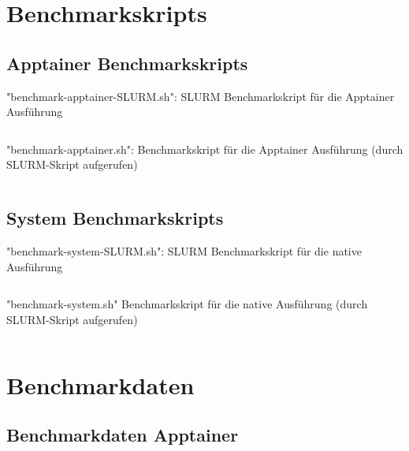\chapter{Benchmarkskripts} \label{cha:appendix-benchmarkskripts}

\section{Apptainer Benchmarkskripts}

\begin{listing}[H]
    \caption{"benchmark-apptainer-SLURM.sh": SLURM Benchmarkskript für die Apptainer Ausführung}
    \label{lst:appdx-SLURM-benchmark-apptainer}
    \inputminted{bash}{./code-examples/benchmark-apptainer-SLURM.sh}
\end{listing}

\begin{listing}[H]
    \caption{"benchmark-apptainer.sh": Benchmarkskript für die Apptainer Ausführung (durch SLURM-Skript aufgerufen)}
    \label{lst:appdx-benchmark-apptainer}
    \inputminted{bash}{./code-examples/benchmark-apptainer.sh}
\end{listing}

\section{System Benchmarkskripts}

\begin{listing}[H]
    \caption{"benchmark-system-SLURM.sh": SLURM Benchmarkskript für die native Ausführung}
    \label{lst:appdx-SLURM-benchmark-system}
    \inputminted{bash}{./code-examples/benchmark-system-SLURM.sh}
\end{listing}
\pagebreak

\begin{listing}[H]
    \caption{"benchmark-system.sh" Benchmarkskript für die native Ausführung (durch SLURM-Skript aufgerufen)}
    \label{lst:appdx-benchmark-system}
    \inputminted{bash}{./code-examples/benchmark-system.sh}
\end{listing}


\chapter{Benchmarkdaten} \label{cha:appendix-benchmarkdaten}

\section{Benchmarkdaten Apptainer}

